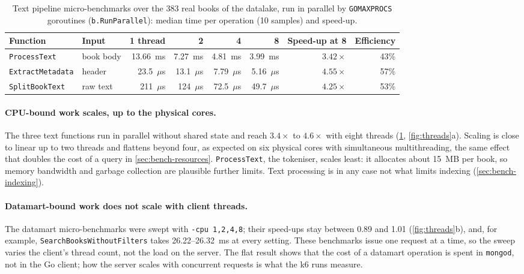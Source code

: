 \documentclass[10pt,a4paper]{article}
\newcommand{\code}[1]{\texttt{#1}}
\begin{document}
\begin{table}[htbp]
  \centering
  \footnotesize
  \caption{Text pipeline micro-benchmarks over the 383 real books of the
  datalake, run in parallel by \code{GOMAXPROCS} goroutines
  (\code{b.RunParallel}): median time per operation (10 samples) and speed-up.}
  \label{tab:micro}
  \begin{tabular}{@{}llrrrrrr@{}}
    \toprule
    Function & Input & 1 thread & 2 & 4 & 8 & Speed-up at 8 & Efficiency \\
    \midrule
    \code{ProcessText} & book body & 13.66~ms & 7.27~ms & 4.81~ms & 3.99~ms & $3.42\times$ & 43\% \\
    \code{ExtractMetadata} & header & 23.5~$\mu$s & 13.1~$\mu$s & 7.79~$\mu$s & 5.16~$\mu$s & $4.55\times$ & 57\% \\
    \code{SplitBookText} & raw text & 211~$\mu$s & 124~$\mu$s & 72.5~$\mu$s & 49.7~$\mu$s & $4.25\times$ & 53\% \\
    \bottomrule
  \end{tabular}
\end{table}

\paragraph{CPU-bound work scales, up to the physical cores.}
The three text functions run in parallel without shared state and reach
$3.4\times$ to $4.6\times$ with eight threads (\cref{tab:micro},
\cref{fig:threads}a). Scaling is close to linear up to two threads and flattens
beyond four, as expected on six physical cores with simultaneous
multithreading, the same effect that doubles the cost of a query in
\cref{sec:bench-resources}. \code{ProcessText}, the tokeniser, scales least: it
allocates about 15~MB per book, so memory bandwidth and garbage collection are
plausible further limits. Text processing is in any case not what limits
indexing (\cref{sec:bench-indexing}).

\paragraph{Datamart-bound work does not scale with client threads.}
The datamart micro-benchmarks were swept with \code{-cpu 1,2,4,8}; their
speed-ups stay between 0.89 and 1.01 (\cref{fig:threads}b), and, for example,
\code{SearchBooksWithoutFilters} takes 26.22--26.32~ms at every setting. These
benchmarks issue one request at a time, so the sweep varies the client's thread
count, not the load on the server. The flat result shows that the cost of a
datamart operation is spent in \code{mongod}, not in the Go client; how the
server scales with concurrent requests is what the k6 runs measure.
\end{document}
